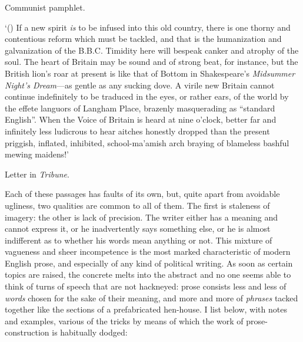 \begin{flushright} Communist pamphlet. \end{flushright}

`() If a new spirit \textit{is} to be infused into this old
country, there is one thorny and contentious reform which must be
tackled, and that is the humanization and galvanization of the B.B.C.
Timidity here will bespeak canker and atrophy of the soul. The heart
of Britain may be sound and of strong beat, for instance, but the
British lion's roar at present is like that of Bottom in Shakespeare's
\textit{Midsummer Night's Dream}---as gentle as any sucking dove. A
virile new Britain cannot continue indefinitely to be traduced in the
eyes, or rather ears, of the world by the effete languors of Langham
Place, brazenly masquerading as ``standard English''. When the Voice
of Britain is heard at nine o'clock, better far and infinitely less
ludicrous to hear aitches honestly dropped than the present priggish,
inflated, inhibited, school-ma'amish arch braying of blameless bashful
mewing maidens!'

\begin{flushright} Letter in \textit{Tribune}. \end{flushright}

Each of these passages has faults of its own, but, quite apart from
avoidable ugliness, two qualities are common to all of them. The first
is staleness of imagery: the other is lack of precision. The writer
either has a meaning and cannot express it, or he inadvertently says
something else, or he is almost indifferent as to whether 
his words mean anything or not. This mixture of vagueness and sheer
incompetence is the most marked characteristic of modern English
prose, and especially of any kind of political writing. As soon as
certain topics are raised, the concrete melts into the abstract and no
one seems able to think of turns of speech that are not hackneyed:
prose consists less and less of \textit{words} chosen for the sake of
their meaning, and more and more of \textit{phrases} tacked together
like the sections of a prefabricated hen-house. I list below, with
notes and examples, various of the tricks by means of which the work
of prose-construction is habitually dodged:

\vspace{1\baselineskip}

